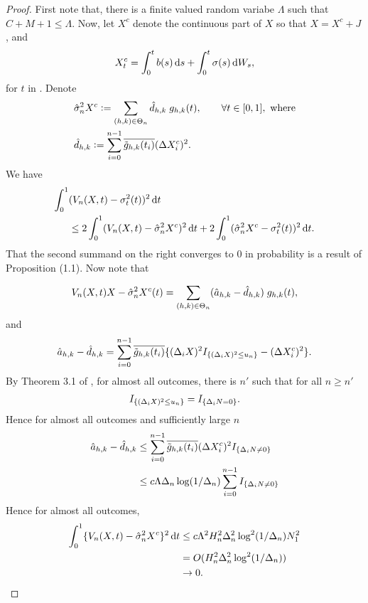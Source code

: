 \begin{proof}
  First note that, there is a finite valued random variabe $\Lambda$ such that $C + M + 1 \le \Lambda$. Now, 
  let $X^c$ denote the continuous part of $X$ so that $X = X^c + J$, and 
  \begin{align}
  X^c_t = \int^t_0 b(s) \D s + \int^t_0 \sigma(s) \D W_s,
    \label{eq:contpart}
  \end{align}
  for $t$ in \domain. Denote
  \begin{align}
    & \hat{\sigma}_{n}^2{X^c}:=\sum_{(h,k) \in \Theta_n} \hat{d}_{h,k}\;g_{h,k}(t), \qquad \forall t \in [0,1], \text{ where}\\
  &\hat{d}_{h,k} := \sum_{i =0}^{n-1} \overline{\tilde{g}_{h,k}(t_i)} (\Delta X^c_i)^2.  \notag
    \label{}
  \end{align}
We have
\begin{align}
  \int_0^1 & (\jvn  - \sv(t))^2\D t \notag\\
  & \le  2 \int_0^1  (\jvn  - \svn{X^c})^2\D t +   2\int_0^1  (\svn{X^c} - \sv(t) )^2\D t.
\end{align}
That the second summand on the right converges to 0 in probability is a result of Proposition (1.1). 
Now note that

\begin{align}
  V_n(X, t){X}  - \hat{\sigma}_{n}^2{X^c}(t) = \sum_{(h,k) \in \Theta_n} (\hat{a}_{h,k} - \hat{d}_{h,k})\;g_{h,k}(t),\notag
  \label{}
\end{align}
and 
\begin{align}
  \hat{a}_{h,k} - \hat{d}_{h,k} = \sum_{i =0}^{n-1} \overline{\tilde{g}_{h,k}(t_i)}\{ (\Delta_i X)^2 I_{\{(\Delta_i X)^2 \le u_n\}}- (\Delta X^c_i)^2\}.\notag
  \label{}
\end{align}
By Theorem 3.1 of \cite{Mancini2009}, for almost all outcomes, there is $n'$ such that for all $n \ge n'$ 
\begin{align}
  I_{\{(\Delta_i X)^2 \le u_n\}} =I_{\{\Delta_i N = 0\}}. \notag
  \label{}
\end{align}
Hence for almost all outcomes and sufficiently large $n$  
\begin{align}
   \hat{a}_{h,k} - \hat{d}_{h,k} &\le \sum_{i =0}^{n-1} \overline{\tilde{g}_{h,k}(t_i)}  (\Delta X^c_i)^2  I_{\{\Delta_i N \not= 0\}}\notag\\
& \le  c \Lambda \Delta_n \log(1/\Delta_n)\sum_{i =0}^{n-1}I_{\{\Delta_i N \not= 0\}} \notag \\
  \label{}
\end{align}
Hence for almost all outcomes,
\begin{align}
  \int^1_0\{\jvn  - \svn{X^c}\}^2 \D t & \le c \Lambda^2 H_n^2 \Delta_n^2\log^2(1/\Delta_n) N_1^2\notag\\
  & = O(H_n^2 \Delta_n^2\log^2(1/\Delta_n))\notag \\
  & \to 0.
  \label{}
\end{align}
\end{proof}
